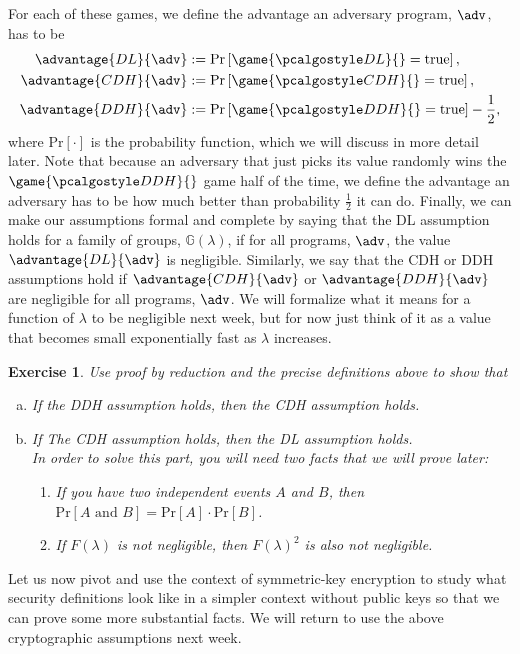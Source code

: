 \documentclass[12pt]{article}
\newcommand{\G}[0]{\mathbb{G}}
\newcommand{\pr}[1]{\text{Pr}\left[#1\right]}
\newtheorem{exercise}{Exercise}
\theoremstyle{definition}
\theoremstyle{remark}
\theoremstyle{definition}
\begin{document}
For each of these games, we define the advantage an adversary program, $\adv$, has to be
\begin{align*}
\advantage{DL}{\adv} &:= \pr{\game{\algo{DL}}{} = \text{true}},\\
\advantage{CDH}{\adv} &:= \pr{\game{\algo{CDH}}{} = \text{true}},\\
\advantage{DDH}{\adv} &:= \pr{\game{\algo{DDH}}{} = \text{true}} - \frac{1}{2},
\end{align*} where $\pr{\cdot}$ is the probability function, which we will discuss in more detail later. Note that because an adversary that just picks its value randomly wins the $\game{\algo{DDH}}{}$ game half of the time, we define the advantage an adversary has to be how much better than probability $\frac{1}{2}$ it can do. Finally, we can make our assumptions formal and complete by saying that the DL assumption holds for a family of groups, $\G(\lambda)$, if for all programs, $\adv$, the value $\advantage{DL}{\adv}$ is negligible. Similarly, we say that the CDH or DDH assumptions hold if $\advantage{CDH}{\adv}$ or $\advantage{DDH}{\adv}$ are negligible for all programs, $\adv$. We will formalize what it means for a function of $\lambda$ to be negligible next week, but for now just think of it as a value that becomes small exponentially fast as $\lambda$ increases.

\begin{exercise} Use proof by reduction and the precise definitions above to show that
\begin{enumerate}[(a)]
\item If the DDH assumption holds, then the CDH assumption holds.
\item If The CDH assumption holds, then the DL assumption holds.\\
In order to solve this part, you will need two facts that we will prove later:
\begin{enumerate}[(1)]
\item If you have two independent events $A$ and $B$, then $\pr{A\text{ and }B} = \pr{A}\cdot\pr{B}$.
\item If $F(\lambda)$ is not negligible, then $F(\lambda)^2$ is also not negligible.
\end{enumerate}
\end{enumerate}
\end{exercise}

Let us now pivot and use the context of symmetric-key encryption to study what security definitions look like in a simpler context without public keys so that we can prove some more substantial facts. We will return to use the above cryptographic assumptions next week.\\
\end{document}
